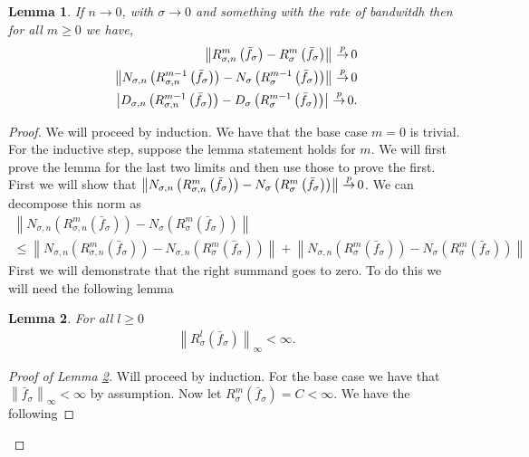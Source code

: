 \documentclass{article} %
\def\gkde{{\bar{f}_\sigma}} %
\def\cip{\,{\buildrel p \over \rightarrow}\,}
\def\irwlm{{R_{\sigma,n}^{m}}}
\def\girwlm{{R_{\sigma}^m}}
\def\l{\left}
\def\r{\right}
\newtheorem{lem}{Lemma}
\theoremstyle{definition}
\begin{document}
\begin{lem}
    If $n\to 0$, with $\sigma \to 0$ and something with the rate of bandwitdh then for all $m\ge0$ we have,
	\begin{eqnarray*}
		\l\| \irwlm\left( \gkde \right)- \girwlm\left( \gkde \right)  \r\|\cip 0\\
                \l\| N_{\sigma,n} \left( R^{m-1}_{\sigma,n}\left( \gkde \right) \right)- N_{\sigma}\left( R^{m-1}_{\sigma}\left( \gkde \right) \right)  \r\|\cip 0\\
                \l| D_{\sigma,n} \left(  R^{m-1}_{\sigma,n}\left( \gkde \right) \right)- D_{\sigma}\left( R^{m-1}_{\sigma}\left( \gkde \right) \right)  \r|\cip 0.
	\end{eqnarray*}
\end{lem}
\begin{proof}
    We will proceed by induction. We have that the base case $m=0$ is trivial. For the inductive step, suppose the lemma statement holds for $m$. We will first prove the lemma for the last two limits and then use those to prove the first. First we will show that $\l\| N_{\sigma,n} \left( R_{\sigma,n}^m\left( \gkde \right) \right)- N_{\sigma}\left( R_{\sigma}^m \left( \gkde \right) \right)  \r\|\cip 0$. We can decompose this norm as
    \begin{eqnarray*}
        \l\| N_{\sigma,n} \left( R_{\sigma,n}^m\left( \gkde \right) \right)- N_{\sigma}\left( R_{\sigma}^m \left( \gkde \right) \right)  \r\|\\
        \le \l\|N_{\sigma,n} \left( R_{\sigma,n}^m\left( \gkde \right) \right) - N_{\sigma,n} \left( R_\sigma^{m}\left( \gkde  \right)\r)  \r\| +\l\|N_{\sigma,n} \left( R_\sigma^{m}\left( \gkde  \right)\r)  - N_{\sigma}\left(R^m_\sigma \left( \gkde \right) \right) \r\|
    \end{eqnarray*}
        First we will demonstrate that the right summand goes to zero. To do this we will need the following lemma
        \begin{lem}\label{lem:rsigminfbnd}
            For all $l\ge 0$
            \begin{eqnarray*}
                \l\|R_\sigma^l\left( \gkde \right)\r\|_\infty < \infty.
            \end{eqnarray*}
        \end{lem}
        \begin{proof}[Proof of Lemma \ref{lem:rsigminfbnd}]
            Will proceed by induction. For the base case we have that $\l\|\gkde\r\|_\infty < \infty$ by assumption. Now let $R_{\sigma}^m \left( \gkde \right) = C < \infty$. We have the following

\end{proof}
\end{proof}
\end{document}
